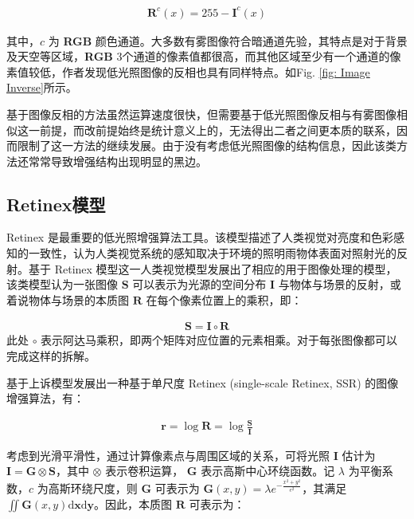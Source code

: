 \documentclass[letterpaper,10pt]{article}
\begin{document}
		\begin{equation}
			\begin{aligned}
				\mathbf{R}^c (x) = 255 - \mathbf{I}^c(x)
			\end{aligned}
			\label{eq: Image Reverse}
		\end{equation}
		
		其中，$c$ 为 \textbf{RGB} 颜色通道。大多数有雾图像符合暗通道先验，其特点是对于背景及天空等区域，\textbf{RGB} 3个通道的像素值都很高，而其他区域至少有一个通道的像素值较低，作者发现低光照图像的反相也具有同样特点。如Fig. \ref{fig: Image Inverse}所示。
		
		基于图像反相的方法虽然运算速度很快，但需要基于低光照图像反相与有雾图像相似这一前提，而改前提始终是统计意义上的，无法得出二者之间更本质的联系，因而限制了这一方法的继续发展。由于没有考虑低光照图像的结构信息，因此该类方法还常常导致增强结构出现明显的黑边。
		
		\subsection{Retinex模型}
		
		Retinex 是最重要的低光照增强算法工具。该模型描述了人类视觉对亮度和色彩感知的一致性，认为人类视觉系统的感知取决于环境的照明雨物体表面对照射光的反射。基于 Retinex 模型这一人类视觉模型发展出了相应的用于图像处理的模型，该类模型认为一张图像 $\mathbf{S}$ 可以表示为光源的空间分布 $\mathbf{I}$ 与物体与场景的反射，或着说物体与场景的本质图 $\mathbf{R}$ 在每个像素位置上的乘积，即：
		
		\begin{equation}
			\begin{aligned}
				\mathbf{S} = \mathbf{I} \circ \mathbf{R}
			\end{aligned}
			\label{eq: Retinex}
		\end{equation}
		此处 $\circ$ 表示阿达马乘积，即两个矩阵对应位置的元素相乘。对于每张图像都可以完成这样的拆解。
		
		基于上诉模型发展出一种基于单尺度 Retinex (single-scale Retinex, SSR) 的图像增强算法\cite{557356}，有：
		
		\begin{equation}
			\begin{aligned}
				\mathbf{r} = \log \mathbf{R} = \log \frac{\mathbf{S}}{\mathbf{I}}
			\end{aligned}
			\label{eq: SSR}
		\end{equation}
	
		考虑到光滑平滑性，通过计算像素点与周围区域的关系，可将光照 $\mathbf{I}$ 估计为 $\mathbf{I} = \mathbf{G} \otimes \mathbf{S}$，其中 $\otimes$ 表示卷积运算， $\mathbf{G}$ 表示高斯中心环绕函数。记 $\lambda$ 为平衡系数，$c$ 为高斯环绕尺度，则 $\mathbf{G}$ 可表示为 $\mathbf{G}(x, y) = \lambda \mathit{e}^{-\frac{x^2+y^2}{\mathit{e}^2}}$，其满足 $\iint \mathbf{G}(x,y) \mathrm{d}\mathbf{x}\mathrm{d}\mathbf{y}$。因此，本质图 $\mathbf{R}$ 可表示为：
		
\end{document}
